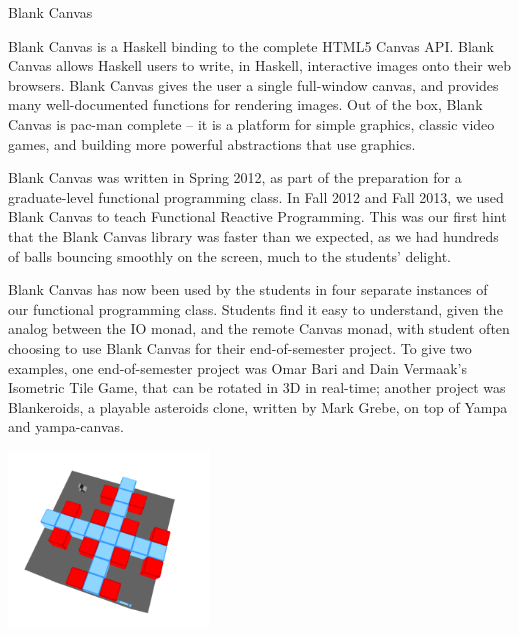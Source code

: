 \begin{hcarentry}[new]{Blank Canvas}
\label{BlankCanvas}
\makeheader

Blank Canvas is a Haskell binding to the complete HTML5 Canvas API.
Blank Canvas allows Haskell users to write, in Haskell, interactive images
onto their web browsers. Blank Canvas gives the user a single full-window
canvas, and provides many well-documented functions for rendering images.
Out of the box,
Blank Canvas is pac-man complete -- it is a platform
for simple graphics, classic video games,
and building more powerful abstractions that use graphics.

Blank Canvas was written in Spring 2012, as part of the
preparation for a graduate-level
functional programming class. 
In Fall 2012 and Fall 2013, we used Blank Canvas to teach Functional Reactive Programming.
This was our first hint that the Blank Canvas library was faster than we expected,
as we had hundreds of balls bouncing smoothly on the screen, much to the students' delight. 

Blank Canvas has now been used by the students in four separate
instances of our functional programming class. Students find it easy
to understand, given the analog between the IO monad, and the remote
Canvas monad,
%
with student often choosing to use Blank Canvas for their end-of-semester project. 
To give two examples,
one end-of-semester project was
%
Omar Bari and Dain Vermaak's Isometric Tile Game, that can 
be rotated in 3D in real-time;
%
another project was Blankeroids, a playable asteroids clone,
written by Mark Grebe, on top of Yampa and yampa-canvas.
%

\begin{center}
\includegraphics[width=0.4\textwidth]{html/Isometric_Omar_Bari.png}
\end{center}


\end{hcarentry}
